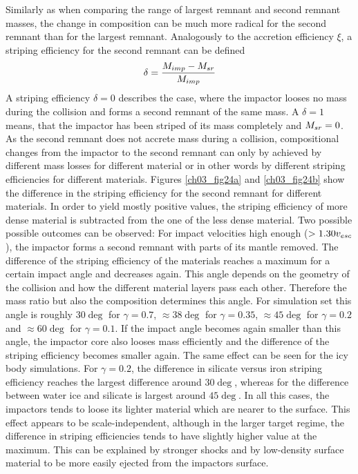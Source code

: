 Similarly as when comparing the range of largest remnant and second remnant masses, the change in composition can be much more radical for the second remnant than for the largest remnant. Analogously to the accretion efficiency $\xi$, a striping efficiency for the second remnant can be defined
\begin{align}
\delta = \frac{M_{imp} - M_{sr}}{M_{imp}}
\end{align}
A striping efficiency $\delta = 0$ describes the case, where the impactor looses no mass during the collision and forms a second remnant of the same mass. A $\delta = 1$ means, that the impactor has been striped of its mass completely and $M_{sr} = 0$. As the second remnant does not accrete mass during a collision, compositional changes from the impactor to the second remnant can only by achieved by different mass losses for different material or in other words by different striping efficiencies for different materials. Figures \ref{ch03_fig24a} and \ref{ch03_fig24b} show the difference in the striping efficiency for the second remnant for different materials. In order to yield mostly positive values, the striping efficiency of more dense material is subtracted from the one of the less dense material. Two possible possible outcomes can be observed: For impact velocities high enough ($ > 1.30 v_{esc}$), the impactor forms a second remnant with parts of its mantle removed. The difference of the striping efficiency of the materials reaches a maximum for a certain impact angle and decreases again. This angle depends on the geometry of the collision and how the different material layers pass each other. Therefore the mass ratio but also the composition determines this angle. For simulation set \css this angle is roughly $30 \deg$ for $\gamma = 0.7$, $\approx 38 \deg$ for $\gamma = 0.35$, $\approx 45 \deg$ for $\gamma = 0.2$ and $\approx 60 \deg$ for $\gamma = 0.1$. If the impact angle becomes again smaller than this angle, the impactor core also looses mass efficiently and the difference of the striping efficiency becomes smaller again. The same effect can be seen for the icy body simulations. For $\gamma = 0.2$, the difference in silicate versus iron striping efficiency reaches the largest difference around $30 \deg$, whereas for the difference between water ice and silicate is largest around $45 \deg$. In all this cases, the impactors tends to loose its lighter material which are nearer to the surface. This effect appears to be scale-independent, although in the larger target regime, the difference in striping efficiencies tends to have slightly higher value at the maximum. This can be explained by stronger shocks and by low-density surface material to be more easily ejected from the impactors surface. 

